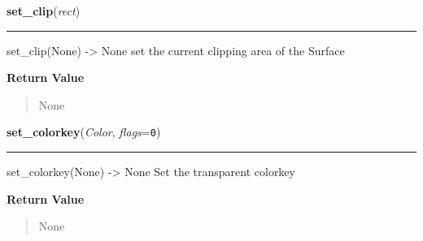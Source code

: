     \label{pygame:Surface:set_clip}

    \vspace{0.5ex}

\hspace{.8\funcindent}\begin{boxedminipage}{\funcwidth}

    \raggedright \textbf{set\_clip}(\textit{rect})

    \vspace{-1.5ex}

    \rule{\textwidth}{0.5\fboxrule}
\setlength{\parskip}{2ex}
    set\_clip(None) -{\textgreater} None set the current clipping area of 
    the Surface

\setlength{\parskip}{1ex}
      \textbf{Return Value}
    \vspace{-1ex}

      \begin{quote}
      None

      \end{quote}

    \end{boxedminipage}

    \label{pygame:Surface:set_colorkey}

    \vspace{0.5ex}

\hspace{.8\funcindent}\begin{boxedminipage}{\funcwidth}

    \raggedright \textbf{set\_colorkey}(\textit{Color}, \textit{flags}={\tt 0})

    \vspace{-1.5ex}

    \rule{\textwidth}{0.5\fboxrule}
\setlength{\parskip}{2ex}
    set\_colorkey(None) -{\textgreater} None Set the transparent colorkey

\setlength{\parskip}{1ex}
      \textbf{Return Value}
    \vspace{-1ex}

      \begin{quote}
      None

      \end{quote}

    \end{boxedminipage}

    \label{pygame:Surface:set_masks}

